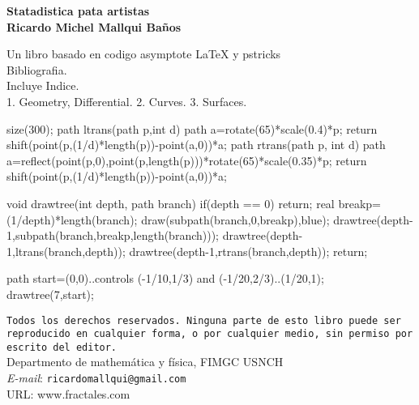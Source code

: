 \documentclass[a4paper]{report}
\begin{document}
 {
 	\thispagestyle{empty}
 	\noindent\bf{Statadistica pata artistas}\\
 	\bf{Ricardo Michel Mallqui Baños}\\
 	\vspace{3cm}

\noindent Un libro basado en codigo asymptote LaTeX y pstricks\\

\noindent Bibliografia.\\
\noindent Incluye Indice.\\
1. Geometry, Differential. 2. Curves. 3. Surfaces. \\
 	\vfill
 	\noindent
 		\begin{asy}
 	size(300);
 	path ltrans(path p,int d)
 	{
 	path a=rotate(65)*scale(0.4)*p;
 	return shift(point(p,(1/d)*length(p))-point(a,0))*a;
 	}
 	path rtrans(path p, int d)
 	{
 	path a=reflect(point(p,0),point(p,length(p)))*rotate(65)*scale(0.35)*p;
 	return shift(point(p,(1/d)*length(p))-point(a,0))*a;
 	}

 	void drawtree(int depth, path branch)
 	{
 	if(depth == 0) return;
 	real breakp=(1/depth)*length(branch);
 	draw(subpath(branch,0,breakp),blue);
 	drawtree(depth-1,subpath(branch,breakp,length(branch)));
 	drawtree(depth-1,ltrans(branch,depth));
 	drawtree(depth-1,rtrans(branch,depth));
 	return;
 	}

 	path start=(0,0)..controls (-1/10,1/3) and (-1/20,2/3)..(1/20,1);
 	drawtree(7,start);
 	\end{asy}

\noindent %
\texttt{Todos los derechos reservados. Ninguna parte de esto
libro puede ser reproducido en cualquier forma,
o por cualquier medio, sin permiso
por escrito del editor.}\\
Departmento de mathemática y física, FIMGC USNCH\\
\emph{E-mail}: \texttt{ricardomallqui@gmail.com}\\
URL: \textsf{www.fractales.com}

 }
\newpage
\renewcommand\listfigurename{Índice general}
\setcounter{page}{1}
\tableofcontents
\renewcommand\listfigurename{Lista de figuras}
\listoffigures
\end{document}
